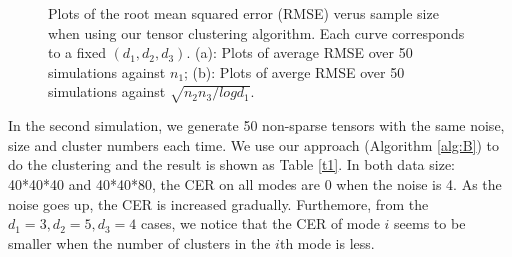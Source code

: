 \documentclass{article}
\begin{document}
\begin{figure}
	\centering
	\caption{Plots of the root mean squared error (RMSE) verus sample size when using our tensor clustering algorithm. Each curve corresponds to a fixed $(d_1,d_2,d_3)$. (a): Plots of average RMSE over 50 simulations against $n_1$; (b): Plots of averge RMSE over 50 simulations against $\sqrt{n_2n_3/logd_1}$. }
	
	\label{fig3}
\end{figure}

In the second simulation, we generate 50 non-sparse tensors with the same noise, size and cluster numbers each time. We use our approach (Algorithm \ref{alg:B}) to do the clustering and the result is shown as Table \ref{t1}. In both data size: 40*40*40 and 40*40*80, the CER on all modes are 0 when the noise is 4. As the noise goes up, the CER is increased gradually. Furthemore, from the $d_1=3, d_2=5, d_3=4$ cases, we notice that the CER of mode $i$ seems to be smaller when the number of clusters in the $i$th mode is less. \par 
\end{document}
